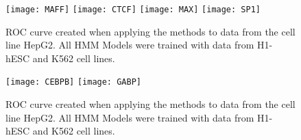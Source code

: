 \documentclass[11pt,a4]{article}
\begin{document}
\begin{figure}[h]
\centering
    \texttt{[image: MAFF]}
    \texttt{[image: CTCF]}
    \texttt{[image: MAX]}
    \texttt{[image: SP1]}
\caption{ROC curve created when applying the methods to data from the cell line HepG2. All HMM Models were trained with data from H1-hESC and K562 cell lines.}
\label{fig:roc.HepG2.6}
\end{figure}

\begin{figure}[h]
\centering
    \texttt{[image: CEBPB]}
    \texttt{[image: GABP]}
\caption{ROC curve created when applying the methods to data from the cell line HepG2. All HMM Models were trained with data from H1-hESC and K562 cell lines.}
\label{fig:roc.HepG2.7}
\end{figure}
\end{document}
